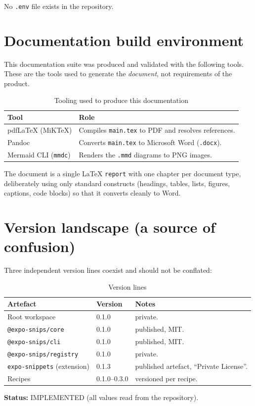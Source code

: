 No \texttt{.env} file exists in the repository.

\section{Documentation build environment}

This documentation suite was produced and validated with the following tools.
These are the tools used to generate the \emph{document}, not requirements of
the product.

\begin{longtable}{p{4.6cm}p{9.6cm}}
\caption{Tooling used to produce this documentation}\\
\toprule
\textbf{Tool} & \textbf{Role} \\
\midrule

pdfLaTeX (MiKTeX) & Compiles \texttt{main.tex} to PDF and resolves references. \\
Pandoc & Converts \texttt{main.tex} to Microsoft Word (\texttt{.docx}). \\
Mermaid CLI (\texttt{mmdc}) & Renders the \texttt{.mmd} diagrams to PNG images. \\
\bottomrule
\end{longtable}

The document is a single \LaTeX{} \texttt{report} with one chapter per document
type, deliberately using only standard constructs (headings, tables, lists,
figures, captions, code blocks) so that it converts cleanly to Word.

\section{Version landscape (a source of confusion)}

Three independent version lines coexist and should not be conflated:

\begin{longtable}{p{5cm}p{2.6cm}p{6.6cm}}
\caption{Version lines}\\
\toprule
\textbf{Artefact} & \textbf{Version} & \textbf{Notes} \\
\midrule

Root workspace & 0.1.0 & private. \\
\texttt{@expo-snips/core} & 0.1.0 & published, MIT. \\
\texttt{@expo-snips/cli} & 0.1.0 & published, MIT. \\
\texttt{@expo-snips/registry} & 0.1.0 & private. \\
\texttt{expo-snippets} (extension) & 0.1.3 & published artefact, ``Private
License''. \\
Recipes & 0.1.0--0.3.0 & versioned per recipe. \\
\bottomrule
\end{longtable}

\textbf{Status:} IMPLEMENTED (all values read from the repository).
